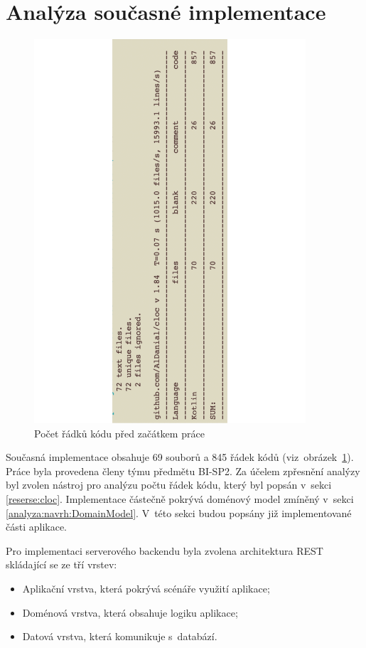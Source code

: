 \section{Analýza současné implementace}\label{analyza:soucasnaImplementace}
    \begin{figure}\centering
	   \includegraphics[angle=-90, width=0.9\textwidth]{pdfs/Cloc1}
	   \caption[Počet řádků kódu před začátkem práce]{Počet řádků kódu před začátkem práce}\label{image:cloc1}
    \end{figure}
    Současná implementace obsahuje 69 souborů a 845 řádek kódů (viz~obrázek~\ref{image:cloc1}). Práce byla provedena členy týmu předmětu BI-SP2. Za účelem zpřesnění analýzy byl zvolen nástroj pro analýzu počtu řádek kódu, který byl popsán v~sekci \ref{reserse:cloc}. Implementace částečně pokrývá doménový model zmíněný v~sekci \ref{analyza:navrh:DomainModel}. V~této sekci budou popsány již implementované části aplikace. 
     
    Pro implementaci serverového backendu byla zvolena architektura REST skládající se ze tří vrstev:
    \begin{itemize}
         \setlength\itemsep{0.3em}
         \item Aplikační vrstva, která pokrývá scénáře využití aplikace;
         \item Doménová vrstva, která obsahuje logiku aplikace;
         \item Datová vrstva, která komunikuje s~databází.
    \end{itemize}
    
